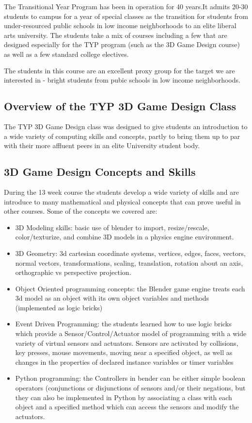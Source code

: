 \documentclass{sig-alternate}
\begin{document}
The Transitional Year Program has been in operation for 40 years.It admits 20-30 students to campus
for a year of special classes as the transition for students from under-resourced public schools in low income neighborhoods to an elite liberal arts university.  The students take a mix of courses including a few that are designed especially for the TYP program (such as the 3D Game Design course) as well as a
few standard college electives. 

The students in this course are an excellent proxy group for the target we are interested in - bright
students from pubic schools in low income neighborhoods.

\subsection{Overview of the TYP 3D Game Design Class}
The TYP 3D Game Design class was designed to give students an introduction to a wide variety of
computing skills and concepts, partly to bring them up to par with their more affluent peers in an
elite University student body. 

\subsection{3D Game Design Concepts and Skills}
During the 13 week course the students develop a wide variety of skills and are introduce to
many mathematical and physical concepts that can prove useful in other courses. Some of the
concepts we covered are:
\begin{itemize}
\item 3D Modeling skills: basic use of blender to import, resize/rescale, color/texturize, and combine 3D models in a physics engine environment. 
\item 3D Geometry: 3d cartesian coordinate systems, vertices, edges, faces, vectors, normal vectors, transformations, scaling, translation, rotation about an axis, orthographic vs perspective projection.
\item Object Oriented programming concepts: the Blender game engine treats each 3d model as
an object with its own object variables and methods (implemented as logic bricks)
\item Event Driven Programming: the students learned how to use logic bricks which provide a Sensor/Control/Actuator model of programming with a wide variety of virtual sensors and actuators. Sensors are activated by collisions, key presses, mouse movements, moving near a specified object, as well as changes in the properties of declared instance variables or timer variables
\item Python programming: the Controllers in bender can be either simple boolean operators (conjunctions or disjunctions of sensors and/or their negations, but they can also be implemented in Python by associating a class with each object and a specified method which can access the sensors and modify the actuators. 
\end{itemize}
\end{document}
